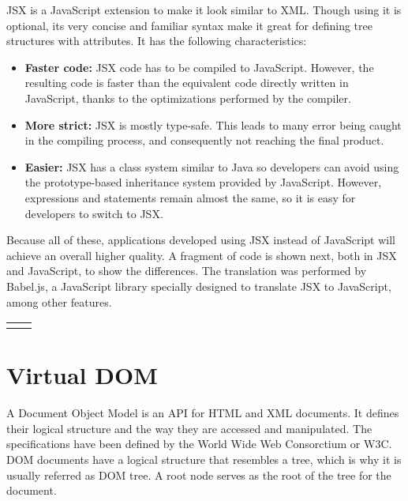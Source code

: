 JSX is a JavaScript extension to make it look similar to XML. Though using it is optional, its very concise and familiar syntax make it great for defining tree structures with attributes. It has the following characteristics:

\begin{itemize}
 \item \textbf{Faster code:} JSX code has to be compiled to JavaScript. However, the resulting code is faster than the equivalent code directly written in JavaScript, thanks to the optimizations performed by the compiler.
 \item \textbf{More strict:} JSX is mostly type-safe. This leads to many error being caught in the compiling process, and consequently not reaching the final product.
 \item \textbf{Easier:} JSX has a class system similar to Java so developers can avoid using the prototype-based inheritance system provided by JavaScript. However, expressions and statements remain almost the same, so it is easy for developers to switch to JSX.
\end{itemize}

Because all of these, applications developed using JSX instead of JavaScript will achieve an overall higher quality. A fragment of code is shown next, both in JSX and JavaScript, to show the differences. The translation was performed by Babel.js, a JavaScript library specially designed to translate JSX to JavaScript, among other features.

\lstset{style=myhtml,linewidth=7cm}

\begin{table}[H]
\centering
\label{my-label}
\begin{tabularx}{15cm}{XX}
 & 
\end{tabularx}
\end{table}

\section{Virtual DOM}

A Document Object Model is an API for HTML and XML documents. It defines their logical structure and the way they are accessed and manipulated. The specifications have been defined by the World Wide Web Consorctium or W3C. DOM documents have a logical structure that resembles a tree, which is why it is usually referred as DOM tree. A root node serves as the root of the tree for the document.

